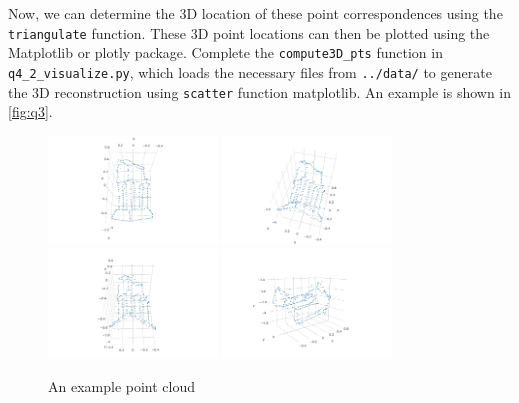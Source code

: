 Now, we can determine the 3D location of these point correspondences using the \texttt{triangulate} function. These 3D point locations can then be plotted using the Matplotlib or plotly package. Complete the \texttt{compute3D\_pts} function in \texttt{q4\_2\_visualize.py}, which loads the necessary files from \texttt{../data/} to generate the 3D reconstruction using \texttt{scatter} function matplotlib. An example is shown in \autoref{fig:q3}. 
\begin{figure}[t]
    \centering
    \includegraphics[width=0.4\textwidth]{images/q3a.png}
    \includegraphics[width=0.4\textwidth]{images/q3b.png}\\
    \includegraphics[width=0.4\textwidth]{images/q3c.png}
    \includegraphics[width=0.4\textwidth]{images/q3d.png}
    \caption{An example point cloud}
    \label{fig:q3}
\end{figure}


